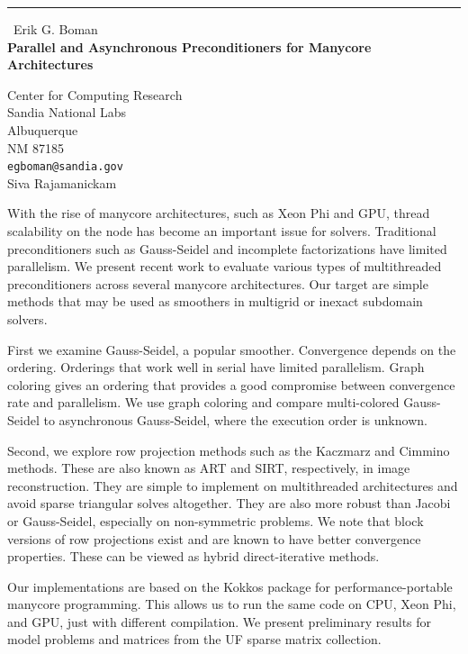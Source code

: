 \documentclass{report}
\begin{document}
\begin{center}
\rule{6in}{1pt} \
{\large Erik G. Boman \\
{\bf Parallel and Asynchronous Preconditioners for Manycore Architectures}}

Center for Computing Research \\ Sandia National Labs \\ Albuquerque \\ NM 87185
\\
{\tt egboman@sandia.gov}\\
Siva Rajamanickam\end{center}

With the rise of manycore architectures, such as Xeon Phi and GPU,
thread scalability on the node has become an important issue
for solvers. Traditional preconditioners such as Gauss-Seidel and
incomplete factorizations have limited parallelism.
We present recent work to evaluate various types of
multithreaded preconditioners across several manycore architectures.
Our target are simple methods that may be used as smoothers in multigrid
or inexact subdomain solvers.

First we examine Gauss-Seidel, a popular smoother. Convergence depends on
the ordering. Orderings that work well in serial have limited parallelism.
Graph coloring gives an ordering that provides a good compromise between
convergence rate and parallelism.
We use graph coloring and compare multi-colored Gauss-Seidel to
asynchronous Gauss-Seidel,
where the execution order is unknown.

Second, we explore row projection
methods such as the Kaczmarz and Cimmino methods. These are
also known as ART and SIRT, respectively, in image reconstruction.
They are simple to implement on multithreaded architectures
and avoid sparse triangular solves altogether.
They are also more robust than Jacobi or Gauss-Seidel,
especially on non-symmetric problems.
We note that block versions of row projections exist and
are known to have better convergence properties.
These can be viewed as hybrid direct-iterative methods.

Our implementations are based on the Kokkos package for
performance-portable manycore programming. This
allows us to run the same code on CPU, Xeon Phi, and GPU,
just with different compilation.
We present preliminary results for model problems
and matrices from the UF sparse matrix collection.
\end{document}

